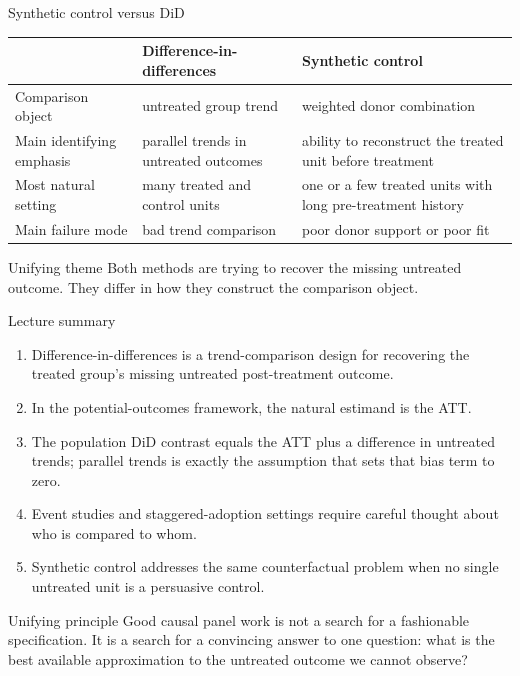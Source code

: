 \documentclass[10pt]{beamer}
\begin{document}
\begin{frame}{Synthetic control versus DiD}
\label{slide:sc_vs_did}
\small
\begin{table}
\centering
\begin{tabular}{p{}p{}p{}}
\toprule
& Difference-in-differences & Synthetic control \\
\midrule
Comparison object & untreated group trend & weighted donor combination \\
Main identifying emphasis & parallel trends in untreated outcomes & ability to reconstruct the treated unit before treatment \\
Most natural setting & many treated and control units & one or a few treated units with long pre-treatment history \\
Main failure mode & bad trend comparison & poor donor support or poor fit \\
\bottomrule
\end{tabular}
\end{table}

\begin{exampleblock}{Unifying theme}
Both methods are trying to recover the missing untreated outcome. They differ in how they construct the comparison object.
\end{exampleblock}
\end{frame}

\begin{frame}{Lecture summary}
\label{slide:summary}
\small
\begin{enumerate}
  \item Difference-in-differences is a trend-comparison design for recovering the treated group's missing untreated post-treatment outcome.
  \item In the potential-outcomes framework, the natural estimand is the ATT.
  \item The population DiD contrast equals the ATT plus a difference in untreated trends; parallel trends is exactly the assumption that sets that bias term to zero.
  \item Event studies and staggered-adoption settings require careful thought about who is compared to whom.
  \item Synthetic control addresses the same counterfactual problem when no single untreated unit is a persuasive control.
\end{enumerate}

\begin{alertblock}{Unifying principle}
Good causal panel work is not a search for a fashionable specification. It is a search for a convincing answer to one question: what is the best available approximation to the untreated outcome we cannot observe?
\end{alertblock}
\end{frame}
\end{document}
